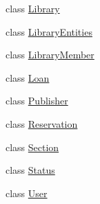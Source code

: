 \begin{DoxyCompactItemize}
\item 
class \mbox{\hyperlink{class_easy_library_application_1_1_w_p_f_1_1_model_1_1_library}{Library}}
\item 
class \mbox{\hyperlink{class_easy_library_application_1_1_w_p_f_1_1_model_1_1_library_entities}{Library\+Entities}}
\item 
class \mbox{\hyperlink{class_easy_library_application_1_1_w_p_f_1_1_model_1_1_library_member}{Library\+Member}}
\item 
class \mbox{\hyperlink{class_easy_library_application_1_1_w_p_f_1_1_model_1_1_loan}{Loan}}
\item 
class \mbox{\hyperlink{class_easy_library_application_1_1_w_p_f_1_1_model_1_1_publisher}{Publisher}}
\item 
class \mbox{\hyperlink{class_easy_library_application_1_1_w_p_f_1_1_model_1_1_reservation}{Reservation}}
\item 
class \mbox{\hyperlink{class_easy_library_application_1_1_w_p_f_1_1_model_1_1_section}{Section}}
\item 
class \mbox{\hyperlink{class_easy_library_application_1_1_w_p_f_1_1_model_1_1_status}{Status}}
\item 
class \mbox{\hyperlink{class_easy_library_application_1_1_w_p_f_1_1_model_1_1_user}{User}}
\end{DoxyCompactItemize}
